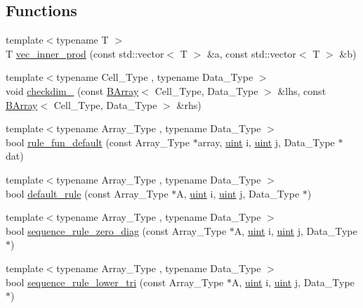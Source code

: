 \subsection*{Functions}
\begin{DoxyCompactItemize}
\item 
{\footnotesize template$<$typename T $>$ }\\T \hyperlink{namespacebarry_a0343fb4152724d5fa1ffa00d4b6182d9}{vec\+\_\+inner\+\_\+prod} (const std\+::vector$<$ T $>$ \&a, const std\+::vector$<$ T $>$ \&b)
\item 
{\footnotesize template$<$typename Cell\+\_\+\+Type , typename Data\+\_\+\+Type $>$ }\\void \hyperlink{namespacebarry_a4ec765fc621c31c4ce712443cc4610c3}{checkdim\+\_\+} (const \hyperlink{classbarry_1_1_b_array}{B\+Array}$<$ Cell\+\_\+\+Type, Data\+\_\+\+Type $>$ \&lhs, const \hyperlink{classbarry_1_1_b_array}{B\+Array}$<$ Cell\+\_\+\+Type, Data\+\_\+\+Type $>$ \&rhs)
\item 
{\footnotesize template$<$typename Array\+\_\+\+Type , typename Data\+\_\+\+Type $>$ }\\bool \hyperlink{namespacebarry_afb5a6f58fa7969d3027468e393eecd51}{rule\+\_\+fun\+\_\+default} (const Array\+\_\+\+Type $\ast$array, \hyperlink{namespacebarry_a11dfc53ddb4672278319aa04f1e09a6c}{uint} i, \hyperlink{namespacebarry_a11dfc53ddb4672278319aa04f1e09a6c}{uint} j, Data\+\_\+\+Type $\ast$dat)
\item 
{\footnotesize template$<$typename Array\+\_\+\+Type , typename Data\+\_\+\+Type $>$ }\\bool \hyperlink{namespacebarry_a1cb28b501bc7f88c0b3d68d51ad672e1}{default\+\_\+rule} (const Array\+\_\+\+Type $\ast$A, \hyperlink{namespacebarry_a11dfc53ddb4672278319aa04f1e09a6c}{uint} i, \hyperlink{namespacebarry_a11dfc53ddb4672278319aa04f1e09a6c}{uint} j, Data\+\_\+\+Type $\ast$)
\item 
{\footnotesize template$<$typename Array\+\_\+\+Type , typename Data\+\_\+\+Type $>$ }\\bool \hyperlink{namespacebarry_adec8d64df14ef90c3e94445e791eaa92}{sequence\+\_\+rule\+\_\+zero\+\_\+diag} (const Array\+\_\+\+Type $\ast$A, \hyperlink{namespacebarry_a11dfc53ddb4672278319aa04f1e09a6c}{uint} i, \hyperlink{namespacebarry_a11dfc53ddb4672278319aa04f1e09a6c}{uint} j, Data\+\_\+\+Type $\ast$)
\item 
{\footnotesize template$<$typename Array\+\_\+\+Type , typename Data\+\_\+\+Type $>$ }\\bool \hyperlink{namespacebarry_a2889c6210e2711e33c34ca9c8b5de7d9}{sequence\+\_\+rule\+\_\+lower\+\_\+tri} (const Array\+\_\+\+Type $\ast$A, \hyperlink{namespacebarry_a11dfc53ddb4672278319aa04f1e09a6c}{uint} i, \hyperlink{namespacebarry_a11dfc53ddb4672278319aa04f1e09a6c}{uint} j, Data\+\_\+\+Type $\ast$)

\end{DoxyCompactItemize}
